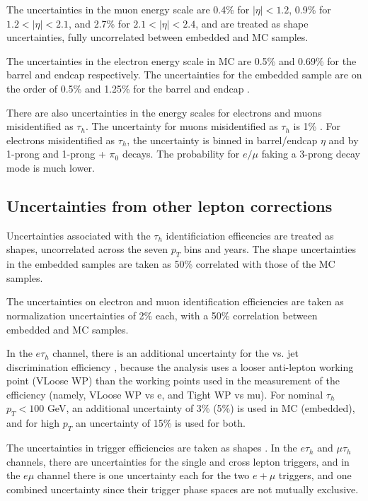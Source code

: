 The uncertainties in the muon energy scale \cite{twiki_MUON_POG_recommendation} are 0.4\% for $|\eta| < 1.2$, 0.9\% for $1.2 < |\eta| < 2.1$, and 2.7\% for $2.1 < |\eta| < 2.4$, and are treated as shape uncertainties, fully uncorrelated between embedded and MC samples.

The uncertainties in the electron energy scale \cite{twiki_Electron_POG_recommendation} in MC are 0.5\% and 0.69\% for the barrel and endcap respectively. The uncertainties for the embedded sample are on the order of 0.5\% and 1.25\% for the barrel and endcap \cite{twiki_embedded_preUL_2018}.

There are also uncertainties in the energy scales for electrons and muons misidentified as $\tau_{h}$. The uncertainty for muons misidentified as $\tau_{h}$ is 1\% \cite{twiki_TAU_POG_tauidrecommendationforrun2}. For electrons misidentified as $\tau_{h}$, the uncertainty is binned in barrel/endcap $\eta$ and by 1-prong and 1-prong + $\pi_0$ decays. The probability for $e/\mu$ faking a 3-prong decay mode is much lower. 

\subsection{Uncertainties from other lepton corrections}
Uncertainties associated with the $\tau_{h}$ identificiation efficencies are treated as shapes, uncorrelated across the seven $p_{T}$ bins and years. The shape uncertainties in the embedded samples are taken as 50\% correlated with those of the MC samples.

The uncertainties on electron and muon identification efficiencies are taken as normalization uncertainties of 2\% each, with a 50\% correlation between embedded and MC samples.

In the $e\tau_{h}$ channel, there is an additional uncertainty for the vs. jet discrimination efficiency \cite{twiki_TAU_POG_tauidrecommendationforrun2}, because the analysis uses a looser anti-lepton working point (VLoose WP) than the working points used in the measurement of the efficiency (namely, VLoose WP vs e, and Tight WP vs mu). For nominal $\tau_{h}$ $p_{T} < 100$ GeV, an additional uncertainty of 3\% (5\%) is used in MC (embedded), and for high $p_{T}$ an uncertainty of 15\% is used for both.

The uncertainties in trigger efficiencies are taken as shapes \cite{twiki_TAU_POG_tauidrecommendationforrun2}. In the $e\tau_{h}$ and $\mu\tau_{h}$ channels, there are uncertainties for the single and cross lepton triggers, and in the $e\mu$ channel there is one uncertainty each for the two $e+\mu$ triggers, and one combined uncertainty since their trigger phase spaces are not mutually exclusive.

